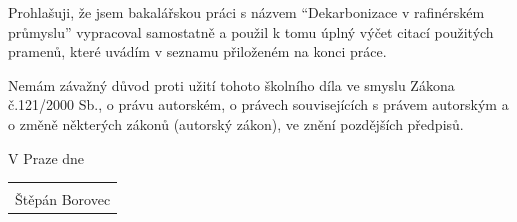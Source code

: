 \newpage
\thispagestyle{empty}
\phantom{.}
\newpage
\thispagestyle{empty}
	\vspace*{\fill}
        \noindent
        {{\LARGE\selectfont{Prohlášení}}\par}
        \vspace*{2\baselineskip}
        Prohlašuji, že jsem bakalářskou práci s názvem \enquote{Dekarbonizace v rafinérském průmyslu} vypracoval samostatně a použil k tomu úplný výčet citací použitých pramenů, které uvádím v seznamu přiloženém na konci práce.
        
        Nemám závažný důvod proti užití tohoto školního díla ve smyslu  Zákona č.121/2000 Sb., o právu autorském, o právech souvisejících s právem
        autorským a o změně některých zákonů (autorský zákon), ve znění pozdějších
        předpisů.

        \vspace*{2\baselineskip}
        \noindent
        V Praze dne~
        \hfill
        \begin{tabular}[t]{@{}c@{}}
        	\makebox[12em]{\dotfill} \\
        	Štěpán Borovec
        \end{tabular}
